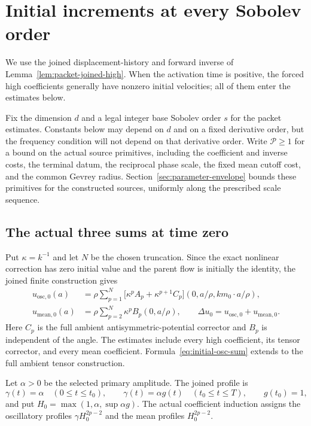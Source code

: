 \section{Initial increments at every Sobolev order}
\label{sec:initial-summability}

We use the joined displacement-history and forward inverse of
Lemma~\ref{lem:packet-joined-high}. When the activation time is positive,
the forced high coefficients generally have nonzero initial velocities;
all of them enter the estimates below.

Fix the dimension $d$ and a legal integer base Sobolev order $s$ for the
packet estimates. Constants below may depend on $d$ and on a fixed
derivative order, but the frequency condition will not depend on that
derivative order. Write $\mathcal P\ge1$ for a bound on the actual source primitives,
including the coefficient and inverse costs, the terminal datum, the
reciprocal phase scale, the fixed mean cutoff cost, and the common Gevrey
radius. Section~\ref{sec:parameter-envelope} bounds these primitives for the
constructed sources, uniformly along the prescribed scale sequence.

\subsection{The actual three sums at time zero}
Put $\kappa=k^{-1}$ and let $N$ be the chosen truncation. Since the exact
nonlinear correction has zero initial value and the parent flow is initially
the identity, the joined finite construction gives
\begin{align}
 u_{\mathrm{osc},0}(a)
 &=\rho\sum_{p=1}^{N}
    \bigl[\kappa^p A_p+\kappa^{p+1}C_p\bigr]
       (0,a/\rho,km_0\cdot a/\rho),\label{eq:initial-osc-sum}\\
 u_{\mathrm{mean},0}(a)
 &=\rho\sum_{p=2}^{N}\kappa^p B_p(0,a/\rho),
 \qquad
 \Delta u_0=u_{\mathrm{osc},0}+u_{\mathrm{mean},0}.
 \label{eq:initial-mean-sum}
\end{align}
Here $C_p$ is the full ambient antisymmetric-potential corrector and $B_p$
is independent of the angle. The estimates include every high coefficient, its tensor corrector,
and every mean coefficient.
Formula~\eqref{eq:initial-osc-sum} extends
\cite[\S3.9, (3.60)]{OAI} to the full ambient tensor construction.

Let $\alpha>0$ be the selected primary amplitude. The joined profile is
\[
 \gamma(t)=\alpha\quad(0\le t\le t_0),\qquad
 \gamma(t)=\alpha g(t)\quad(t_0\le t\le T),\qquad g(t_0)=1,
\]
and put $H_0=\max(1,\alpha,\sup\alpha g)$. The actual coefficient induction
assigns the oscillatory profiles $\gamma H_0^{2p-2}$ and the mean profiles
$H_0^{2p-2}$.

